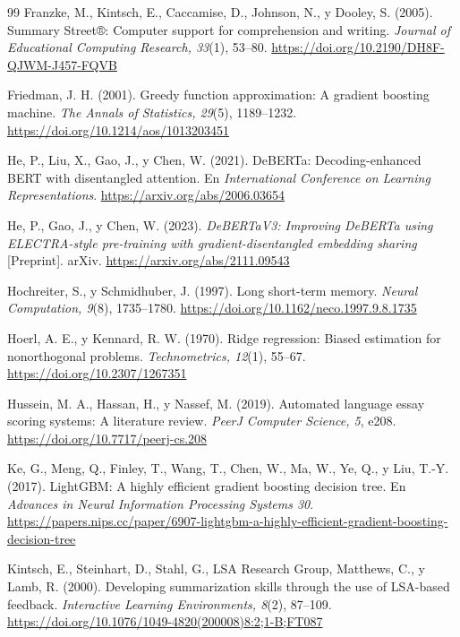 \documentclass[11pt,a4paper]{article}
\begin{document}
\begin{thebibliography}{99}
Franzke, M., Kintsch, E., Caccamise, D., Johnson, N., y Dooley, S. (2005). Summary Street®: Computer support for comprehension and writing. \textit{Journal of Educational Computing Research, 33}(1), 53--80. \url{https://doi.org/10.2190/DH8F-QJWM-J457-FQVB}

Friedman, J. H. (2001). Greedy function approximation: A gradient boosting machine. \textit{The Annals of Statistics, 29}(5), 1189--1232. \url{https://doi.org/10.1214/aos/1013203451}

He, P., Liu, X., Gao, J., y Chen, W. (2021). DeBERTa: Decoding-enhanced BERT with disentangled attention. En \textit{International Conference on Learning Representations}. \url{https://arxiv.org/abs/2006.03654}

He, P., Gao, J., y Chen, W. (2023). \textit{DeBERTaV3: Improving DeBERTa using ELECTRA-style pre-training with gradient-disentangled embedding sharing} [Preprint]. arXiv. \url{https://arxiv.org/abs/2111.09543}

Hochreiter, S., y Schmidhuber, J. (1997). Long short-term memory. \textit{Neural Computation, 9}(8), 1735--1780. \url{https://doi.org/10.1162/neco.1997.9.8.1735}

Hoerl, A. E., y Kennard, R. W. (1970). Ridge regression: Biased estimation for nonorthogonal problems. \textit{Technometrics, 12}(1), 55--67. \url{https://doi.org/10.2307/1267351}

Hussein, M. A., Hassan, H., y Nassef, M. (2019). Automated language essay scoring systems: A literature review. \textit{PeerJ Computer Science, 5}, e208. \url{https://doi.org/10.7717/peerj-cs.208}

Ke, G., Meng, Q., Finley, T., Wang, T., Chen, W., Ma, W., Ye, Q., y Liu, T.-Y. (2017). LightGBM: A highly efficient gradient boosting decision tree. En \textit{Advances in Neural Information Processing Systems 30}. \url{https://papers.nips.cc/paper/6907-lightgbm-a-highly-efficient-gradient-boosting-decision-tree}

Kintsch, E., Steinhart, D., Stahl, G., LSA Research Group, Matthews, C., y Lamb, R. (2000). Developing summarization skills through the use of LSA-based feedback. \textit{Interactive Learning Environments, 8}(2), 87--109. \url{https://doi.org/10.1076/1049-4820(200008)8:2;1-B;FT087}


\end{thebibliography}
\end{document}
